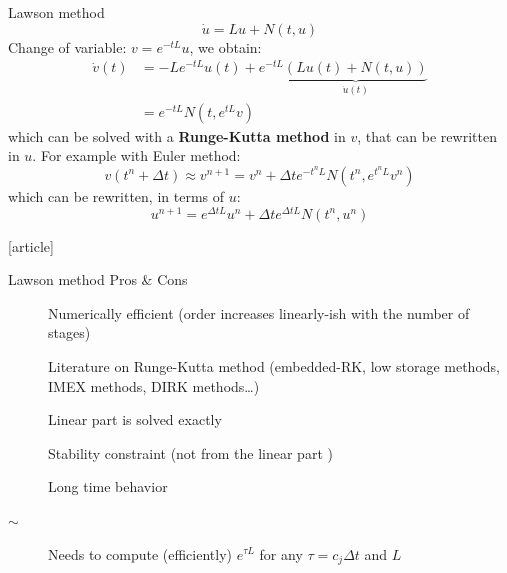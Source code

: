 \documentclass{beamer}
\newcommand{\cmark}{{\color{dgreen}\ding{52}}}
\newcommand{\xmark}{{\color{mred}\ding{55}}}
\newcommand{\bmark}{{\color{morange}$\sim$}}
\newcommand{\mbold}[1]{{\textbf{\color{PLB}#1}}}
\newcommand{\customcite}[1]{\cite{#1}}
\begin{document}
\begin{frame}{Lawson method}
  $$
    \dot{u} = Lu + N(t,u)
  $$
  Change of variable: \mbold{$v = e^{-tL}u$}, we obtain:
  $$
    \begin{aligned}
      \dot{v}(t) &= -Le^{-tL}u(t) + e^{-tL}\underbrace{\left(Lu(t) + N(t,u)\right)}_{\dot{u}(t)} \\
                 &= e^{-tL}N(t,e^{tL}v)
    \end{aligned}
  $$
  which can be solved with a \mbold{Runge-Kutta method} in $v$, that can be rewritten in $u$. For example with Euler method:
  $$
    v(t^n+\Delta t) \approx v^{n+1} = v^n + \Delta t e^{-t^nL}N(t^n,e^{t^nL}v^n)
  $$
  which can be rewritten, in terms of $u$:
  $$
    u^{n+1} = e^{\Delta t L}u^n + \Delta te^{\Delta t L}N(t^n,u^n)
  $$
  \begin{thebibliography}{9}
    [article]
     \customcite{Lawson:1967a} \vspace{-0.25cm}
     \customcite{Hochbruck:2010} \vspace{-0.25cm}
     \customcite{Hochbruck:2020}
  \end{thebibliography}
\end{frame}
\begin{frame}{Lawson method}
  {Pros \& Cons}
  \begin{description}
    \item[\cmark] Numerically efficient (order increases linearly-ish with the number of stages)
    \item[\cmark] Literature on Runge-Kutta method (embedded-RK, low storage methods, IMEX methods, DIRK methods\dots)
    \item[\cmark] Linear part is solved exactly
    \item[\xmark] Stability constraint (not from the linear part \cmark)
    \item[\xmark] Long time behavior
    \item[\bmark] Needs to compute (efficiently) $e^{\tau L}$ for any $\tau=c_j\Delta t$ and $L$
  \end{description}
\end{frame}
\end{document}
